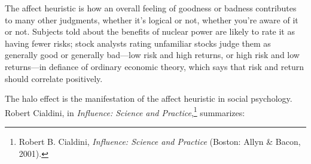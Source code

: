 \bigskip


{
 The affect heuristic is how an overall feeling of goodness or
badness contributes to many other judgments, whether
it's logical or not, whether you're
aware of it or not. Subjects told about the benefits of nuclear power
are likely to rate it as having fewer risks; stock analysts rating
unfamiliar stocks judge them as generally good or generally bad---low
risk and high returns, or high risk and low returns---in defiance of
ordinary economic theory, which says that risk and return should
correlate positively. }

{
 The halo effect is the manifestation of the affect heuristic in
social psychology. Robert Cialdini, in \textit{Influence: Science and
Practice},\footnote{Robert B. Cialdini, \textit{Influence: Science and Practice}
(Boston: Allyn \& Bacon, 2001).} summarizes:}

